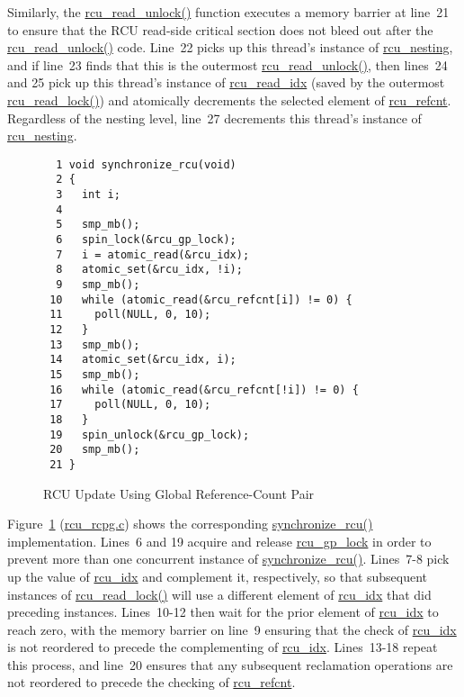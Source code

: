 Similarly, the \url{rcu_read_unlock()} function executes a memory barrier
at line~21
to ensure that the RCU read-side critical section does not bleed out
after the \url{rcu_read_unlock()} code.
Line~22 picks up this thread's instance of \url{rcu_nesting}, and if
line~23 finds that this is the outermost \url{rcu_read_unlock()},
then lines~24 and 25 pick up this thread's instance of \url{rcu_read_idx}
(saved by the outermost \url{rcu_read_lock()}) and atomically decrements
the selected element of \url{rcu_refcnt}.
Regardless of the nesting level, line~27 decrements this thread's
instance of \url{rcu_nesting}.

\begin{figure}[tbp]
{ \scriptsize
\begin{verbatim}
  1 void synchronize_rcu(void)
  2 {
  3   int i;
  4 
  5   smp_mb();
  6   spin_lock(&rcu_gp_lock);
  7   i = atomic_read(&rcu_idx);
  8   atomic_set(&rcu_idx, !i);
  9   smp_mb();
 10   while (atomic_read(&rcu_refcnt[i]) != 0) {
 11     poll(NULL, 0, 10);
 12   }
 13   smp_mb();
 14   atomic_set(&rcu_idx, i);
 15   smp_mb();
 16   while (atomic_read(&rcu_refcnt[!i]) != 0) {
 17     poll(NULL, 0, 10);
 18   }
 19   spin_unlock(&rcu_gp_lock);
 20   smp_mb();
 21 }
\end{verbatim}
}
\caption{RCU Update Using Global Reference-Count Pair}
\label{fig:defer:RCU Update Using Global Reference-Count Pair}
\end{figure}

Figure~\ref{fig:defer:RCU Update Using Global Reference-Count Pair}
(\url{rcu_rcpg.c})
shows the corresponding \url{synchronize_rcu()} implementation.
Lines~6 and 19 acquire and release \url{rcu_gp_lock} in order to
prevent more than one concurrent instance of \url{synchronize_rcu()}.
Lines~7-8 pick up the value of \url{rcu_idx} and complement it,
respectively, so that subsequent instances of \url{rcu_read_lock()}
will use a different element of \url{rcu_idx} that did preceding
instances.
Lines~10-12 then wait for the prior element of \url{rcu_idx} to
reach zero, with the memory barrier on line~9 ensuring that the check
of \url{rcu_idx} is not reordered to precede the complementing of
\url{rcu_idx}.
Lines~13-18 repeat this process, and line~20 ensures that any
subsequent reclamation operations are not reordered to precede the
checking of \url{rcu_refcnt}.

